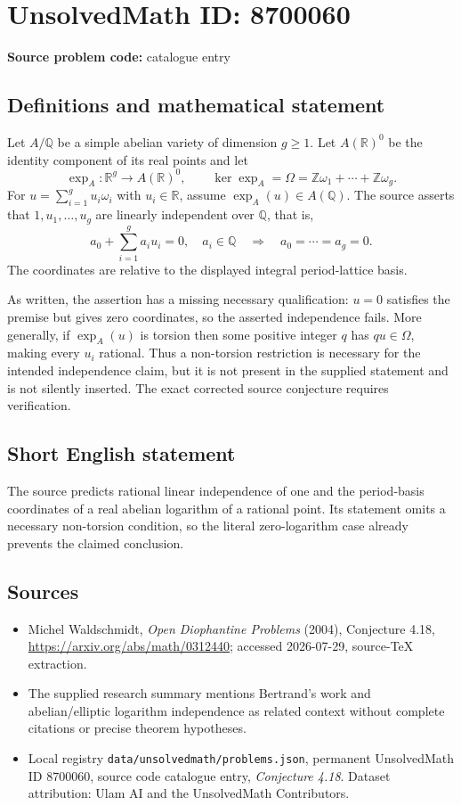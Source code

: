 \documentclass[11pt]{article}
\begin{document}
\section*{UnsolvedMath ID: 8700060}
\textbf{Source problem code:} catalogue entry
\subsection{Definitions and mathematical statement}
Let $A/\mathbb Q$ be a simple abelian variety of dimension $g\geq1$. Let $A(\mathbb R)^0$ be the identity component of its real points and let
\[
\exp_A:\mathbb R^g\longrightarrow A(\mathbb R)^0,\qquad
\ker\exp_A=\Omega=\mathbb Z\omega_1+\cdots+\mathbb Z\omega_g.
\]
For $u=\sum_{i=1}^g u_i\omega_i$ with $u_i\in\mathbb R$, assume $\exp_A(u)\in A(\mathbb Q)$. The source asserts that $1,u_1,\ldots,u_g$ are linearly independent over $\mathbb Q$, that is,
\[
a_0+\sum_{i=1}^g a_i u_i=0,\quad a_i\in\mathbb Q
\quad\Longrightarrow\quad a_0=\cdots=a_g=0.
\]
The coordinates are relative to the displayed integral period-lattice basis.

As written, the assertion has a missing necessary qualification: $u=0$ satisfies the premise but gives zero coordinates, so the asserted independence fails. More generally, if $\exp_A(u)$ is torsion then some positive integer $q$ has $qu\in\Omega$, making every $u_i$ rational. Thus a non-torsion restriction is necessary for the intended independence claim, but it is not present in the supplied statement and is not silently inserted. The exact corrected source conjecture requires verification.
\subsection{Short English statement}
The source predicts rational linear independence of one and the period-basis coordinates of a real abelian logarithm of a rational point. Its statement omits a necessary non-torsion condition, so the literal zero-logarithm case already prevents the claimed conclusion.
\subsection{Sources}
\begin{itemize}
\item Michel Waldschmidt, \emph{Open Diophantine Problems} (2004), Conjecture 4.18, \url{https://arxiv.org/abs/math/0312440}; accessed 2026-07-29, source-TeX extraction.
\item The supplied research summary mentions Bertrand's work and abelian/elliptic logarithm independence as related context without complete citations or precise theorem hypotheses.
\item Local registry \texttt{data/unsolvedmath/problems.json}, permanent UnsolvedMath ID $8700060$, source code catalogue entry, \emph{Conjecture 4.18}. Dataset attribution: Ulam AI and the UnsolvedMath Contributors.
\end{itemize}
\end{document}
